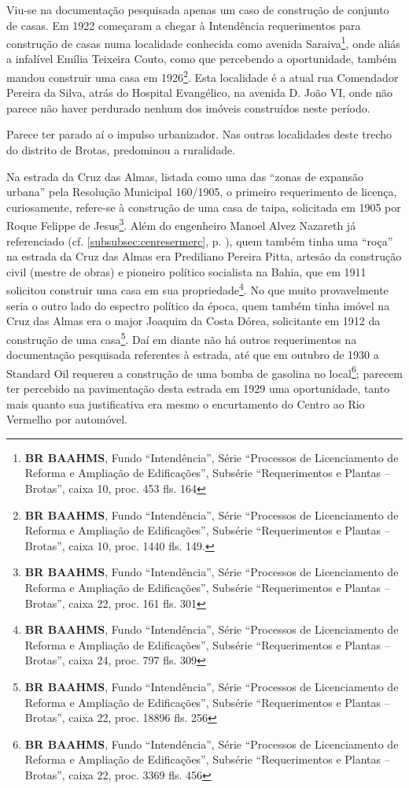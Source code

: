 Viu-se na documentação pesquisada apenas um caso de construção de conjunto de casas. Em 1922 começaram a chegar à Intendência requerimentos para construção de casas numa localidade conhecida como avenida Saraiva\footnote{\textbf{BR BAAHMS}, Fundo ``Intendência'', Série ``Processos de Licenciamento de Reforma e Ampliação de Edificações'', Subsérie ``Requerimentos e Plantas -- Brotas'', caixa 10, proc. 453 fls. 164}, onde aliás a infalível Emília Teixeira Couto, como que percebendo a oportunidade, também mandou construir uma casa em 1926\footnote{\textbf{BR BAAHMS}, Fundo ``Intendência'', Série ``Processos de Licenciamento de Reforma e Ampliação de Edificações'', Subsérie ``Requerimentos e Plantas -- Brotas'', caixa 10, proc. 1440 fls. 149.}. Esta localidade é a atual rua Comendador Pereira da Silva, atrás do Hospital Evangélico, na avenida D. João VI, onde não parece não haver perdurado nenhum dos imóveis construídos neste período.


Parece ter parado aí o impulso urbanizador. Nas outras localidades deste trecho do distrito de Brotas, predominou a ruralidade.

Na estrada da Cruz das Almas, listada como uma das ``zonas de expansão urbana'' pela Resolução Municipal 160/1905, o primeiro requerimento de licença, curiosamente, refere-se à construção de uma casa de taipa, solicitada em 1905 por Roque Felippe de Jesus\footnote{\textbf{BR BAAHMS}, Fundo ``Intendência'', Série ``Processos de Licenciamento de Reforma e Ampliação de Edificações'', Subsérie ``Requerimentos e Plantas -- Brotas'', caixa 22, proc. 161 fls. 301}. Além do engenheiro Manoel Alvez Nazareth já referenciado (cf. \autoref{subsubsec:cenresermerc}, p. \pageref{subsubsec:cenresermerc}), quem também tinha uma ``roça'' na estrada da Cruz das Almas era Prediliano Pereira Pitta, artesão da construção civil (mestre de obras) e pioneiro político socialista na Bahia, que em 1911 solicitou construir uma casa em sua propriedade\footnote{\textbf{BR BAAHMS}, Fundo ``Intendência'', Série ``Processos de Licenciamento de Reforma e Ampliação de Edificações'', Subsérie ``Requerimentos e Plantas -- Brotas'', caixa 24, proc. 797 fls. 309}. No que muito provavelmente seria o outro lado do espectro político da época, quem também tinha imóvel na Cruz das Almas era o major Joaquim da Costa Dórea, solicitante em 1912 da construção de uma casa\footnote{\textbf{BR BAAHMS}, Fundo ``Intendência'', Série ``Processos de Licenciamento de Reforma e Ampliação de Edificações'', Subsérie ``Requerimentos e Plantas -- Brotas'', caixa 22, proc. 18896 fls. 256}. Daí em diante não há outros requerimentos na documentação pesquisada referentes à estrada, até que em outubro de 1930 a Standard Oil requereu a construção de uma bomba de gasolina no local\footnote{\textbf{BR BAAHMS}, Fundo ``Intendência'', Série ``Processos de Licenciamento de Reforma e Ampliação de Edificações'', Subsérie ``Requerimentos e Plantas -- Brotas'', caixa 22, proc. 3369 fls. 456}; parecem ter percebido na pavimentação desta estrada em 1929 uma oportunidade, tanto mais quanto sua justificativa era mesmo o encurtamento do Centro ao Rio Vermelho por automóvel.

